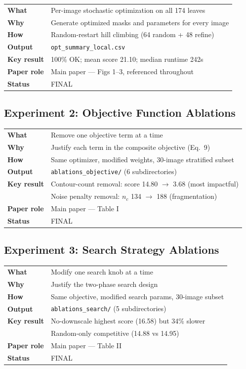 \documentclass[11pt,a4paper]{article}
\newcommand{\filepath}[1]{\texttt{\small #1}}
\begin{document}
\begin{tabular}{ll}
\toprule
\textbf{What} & Per-image stochastic optimization on all 174 leaves \\
\textbf{Why} & Generate optimized masks and parameters for every image \\
\textbf{How} & Random-restart hill climbing (64 random + 48 refine) \\
\textbf{Output} & \filepath{opt\_summary\_local.csv} \\
\textbf{Key result} & 100\% OK; mean score 21.10; median runtime 242s \\
\textbf{Paper role} & Main paper --- Figs 1--3, referenced throughout \\
\textbf{Status} & FINAL \\
\bottomrule
\end{tabular}

\subsection{Experiment 2: Objective Function Ablations}

\begin{tabular}{ll}
\toprule
\textbf{What} & Remove one objective term at a time \\
\textbf{Why} & Justify each term in the composite objective (Eq.~9) \\
\textbf{How} & Same optimizer, modified weights, 30-image stratified subset \\
\textbf{Output} & \filepath{ablations\_objective/} (6 subdirectories) \\
\textbf{Key result} & Contour-count removal: score 14.80 $\to$ 3.68 (most impactful) \\
 & Noise penalty removal: $n_c$ 134 $\to$ 188 (fragmentation) \\
\textbf{Paper role} & Main paper --- Table I \\
\textbf{Status} & FINAL \\
\bottomrule
\end{tabular}

\subsection{Experiment 3: Search Strategy Ablations}

\begin{tabular}{ll}
\toprule
\textbf{What} & Modify one search knob at a time \\
\textbf{Why} & Justify the two-phase search design \\
\textbf{How} & Same objective, modified search params, 30-image subset \\
\textbf{Output} & \filepath{ablations\_search/} (5 subdirectories) \\
\textbf{Key result} & No-downscale highest score (16.58) but 34\% slower \\
 & Random-only competitive (14.88 vs 14.95) \\
\textbf{Paper role} & Main paper --- Table II \\
\textbf{Status} & FINAL \\
\bottomrule
\end{tabular}
\end{document}
